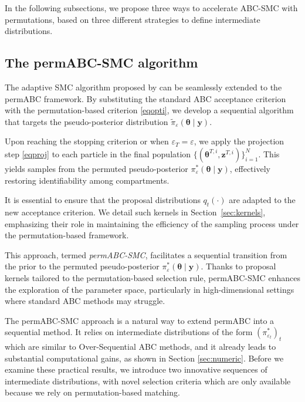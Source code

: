 \documentclass[lineno]{biometrika}
\def\obsdata{\mathbf{y}}
\def\param{\boldsymbol{\theta}}
\def\simdata{\mathbf{z}}
\begin{document}
In the following subsections, we propose three ways to accelerate ABC-SMC with permutations, based on three different strategies to define intermediate distributions.

\subsection{The permABC-SMC algorithm}

The adaptive SMC algorithm proposed by \citet{delmoralAdaptiveSequentialMonte2012} can be seamlessly extended to the permABC framework. By substituting the standard ABC acceptance criterion with the permutation-based criterion \eqref{eqopti}, we develop a sequential algorithm that targets the pseudo-posterior distribution \( \tilde{\pi}_\varepsilon(\param \mid \obsdata) \).

Upon reaching the stopping criterion or when \( \varepsilon_T = \varepsilon \), we apply the projection step \eqref{eqproj} to each particle in the final population \( \{(\param^{T,i}, \simdata^{T,i})\}_{i=1}^N \). This yields samples from the permuted pseudo-posterior \( \pi_\varepsilon^*(\param \mid \obsdata) \), effectively restoring identifiability among compartments.

It is essential to ensure that the proposal distributions \( q_t(\cdot) \) are adapted to the new acceptance criterion. We detail such kernels in Section~\ref{sec:kernels}, emphasizing their role in maintaining the efficiency of the sampling process under the permutation-based framework.

This approach, termed \emph{permABC-SMC}, facilitates a sequential transition from the prior to the permuted pseudo-posterior \( \pi^*_\varepsilon(\param \mid \obsdata) \). Thanks to proposal kernels tailored to the permutation-based selection rule, permABC-SMC enhances the exploration of the parameter space, particularly in high-dimensional settings where standard ABC methods may struggle.

The permABC-SMC approach is a natural way to extend permABC into a sequential method. It relies on intermediate distributions of the form $(\pi^*_{\varepsilon_t})_t$ which are similar to Over-Sequential ABC methods, and it already leads to substantial computational gains, as shown in Section \ref{sec:numeric}. Before we examine these practical results, we introduce two innovative sequences of intermediate distributions, with novel selection criteria which are only available because we rely on permutation-based matching.
\end{document}

